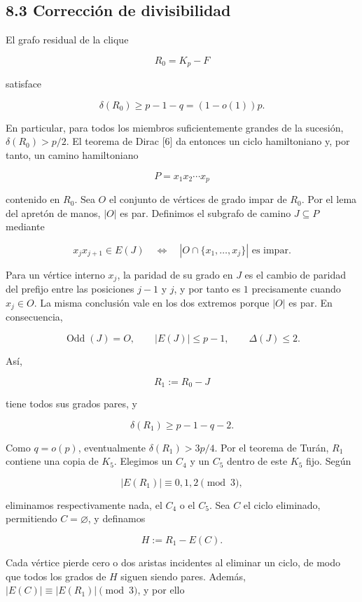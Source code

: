 \documentclass[spanish,11pt,a4paper]{article}
\begin{document}
\subsection{8.3 Corrección de
divisibilidad}\label{correcciuxf3n-de-divisibilidad}

El grafo residual de la clique

\[
R_0=K_p-F
\]

satisface

\[
\delta(R_0)
\ge
p-1-q
=(1-o(1))p.
\tag{8.4}
\]

En particular, para todos los miembros suficientemente grandes de la
sucesión, \(\delta(R_0)>p/2\). El teorema de Dirac {[}6{]} da entonces
un ciclo hamiltoniano y, por tanto, un camino hamiltoniano

\[
P=x_1x_2\cdots x_p
\]

contenido en \(R_0\). Sea \(O\) el conjunto de vértices de grado impar
de \(R_0\). Por el lema del apretón de manos, \(|O|\) es par. Definimos
el subgrafo de camino \(J\subseteq P\) mediante

\[
x_jx_{j+1}\in E(J)
\quad\Longleftrightarrow\quad
|O\cap\{x_1,\ldots,x_j\}|\text{ es impar}.
\tag{8.5}
\]

Para un vértice interno \(x_j\), la paridad de su grado en \(J\) es el
cambio de paridad del prefijo entre las posiciones \(j-1\) y \(j\), y
por tanto es \(1\) precisamente cuando \(x_j\in O\). La misma conclusión
vale en los dos extremos porque \(|O|\) es par. En consecuencia,

\[
\operatorname{Odd}(J)=O,
\qquad
|E(J)|\le p-1,
\qquad
\Delta(J)\le2.
\tag{8.6}
\]

Así,

\[
R_1:=R_0-J
\]

tiene todos sus grados pares, y

\[
\delta(R_1)\ge p-1-q-2.
\tag{8.7}
\]

Como \(q=o(p)\), eventualmente \(\delta(R_1)>3p/4\). Por el teorema de
Turán, \(R_1\) contiene una copia de \(K_5\). Elegimos un \(C_4\) y un
\(C_5\) dentro de este \(K_5\) fijo. Según

\[
|E(R_1)|\equiv0,1,2\pmod3,
\]

eliminamos respectivamente nada, el \(C_4\) o el \(C_5\). Sea \(C\) el
ciclo eliminado, permitiendo \(C=\varnothing\), y definamos

\[
H:=R_1-E(C).
\]

Cada vértice pierde cero o dos aristas incidentes al eliminar un ciclo,
de modo que todos los grados de \(H\) siguen siendo pares. Además,
\(|E(C)|\equiv |E(R_1)|\pmod3\), y por ello
\end{document}

